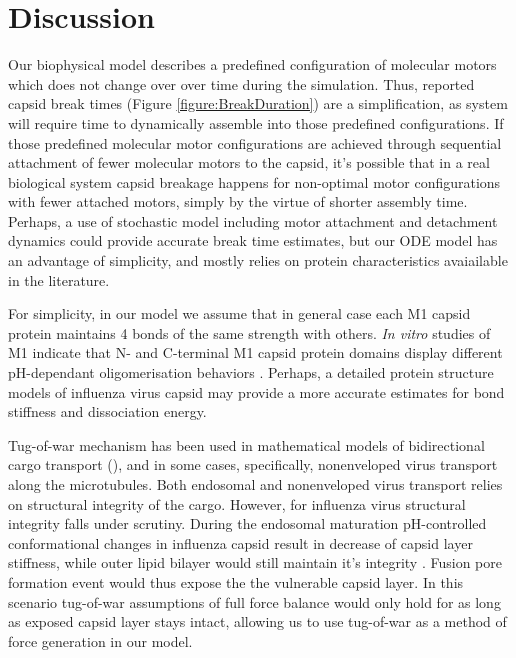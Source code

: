 \section{Discussion}

Our biophysical model describes a predefined configuration of molecular motors which does not change over over time during the simulation. Thus, reported capsid break times (Figure \ref{figure:BreakDuration}) are a simplification, as system will require time to dynamically assemble into those predefined configurations. If those predefined molecular motor configurations are achieved through sequential attachment of fewer molecular motors to the capsid, it's possible that in a real biological system capsid breakage happens for non-optimal motor configurations with fewer attached motors, simply by the virtue of shorter assembly time. Perhaps, a use of stochastic model including motor attachment and detachment dynamics could provide accurate break time estimates, but our ODE model has an advantage of simplicity, and mostly relies on protein characteristics avaiailable in the literature.

For simplicity, in our model we assume that in general case each M1 capsid protein maintains 4 bonds of the same strength with others. \textit{In vitro} studies of M1 indicate that N- and C-terminal M1 capsid protein domains display different pH-dependant oligomerisation behaviors \cite{zhang2012dissection}. Perhaps, a detailed protein structure models of influenza virus capsid may provide a more accurate estimates for bond stiffness and dissociation energy.

Tug-of-war mechanism \cite{hancock2014bidirectional} has been used in mathematical models of bidirectional cargo transport (\cite{muller2008tug}), and in some cases, specifically, nonenveloped virus transport \cite{gazzola2009stochastic} along the microtubules. Both endosomal and nonenveloped virus transport relies on structural integrity of the cargo. However, for influenza virus structural integrity falls under scrutiny. During the endosomal maturation pH-controlled conformational changes in influenza capsid result in decrease of capsid layer stiffness, while outer lipid bilayer would still maintain it's integrity \cite{li2014ph}. Fusion pore formation event would thus expose the the vulnerable capsid layer. In this scenario tug-of-war assumptions of full force balance would only hold for as long as exposed capsid layer stays intact, allowing us to use tug-of-war as a method of force generation in our model.


